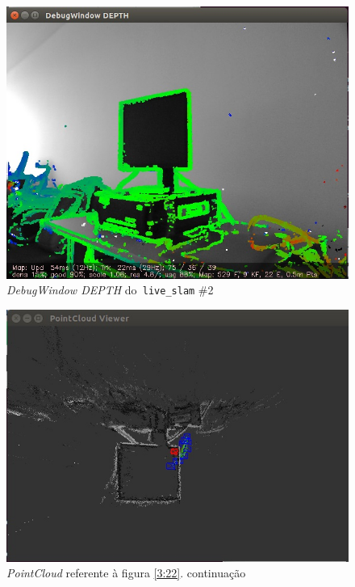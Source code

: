 \begin{figure}[!htb]
	\centering
		\includegraphics[width= \textwidth]{Imagens/figura3-22.jpg}
	\caption{\textit{DebugWindow DEPTH} do\texttt{ live\_slam} \#2}
	\label{fig3:22}
\end{figure}

\begin{figure}[!htb]
	\centering
		\includegraphics[width= \textwidth]{Imagens/figura3-23.jpg}
	\caption{\textit{PointCloud} referente à figura \ref{3:22}. continuação}
	\label{fig3:23}
\end{figure}

